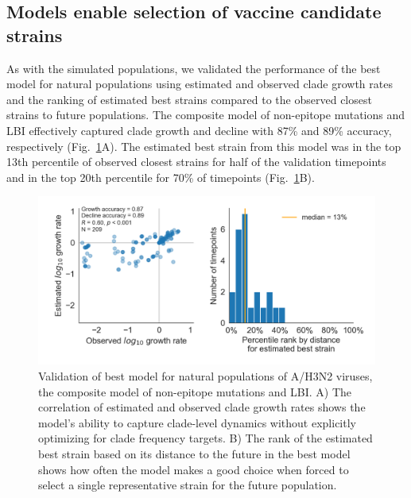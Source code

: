 \subsection*{Models enable selection of vaccine candidate strains}

As with the simulated populations, we validated the performance of the best model for natural populations using estimated and observed clade growth rates and the ranking of estimated best strains compared to the observed closest strains to future populations.
The composite model of non-epitope mutations and LBI effectively captured clade growth and decline with 87\% and 89\% accuracy, respectively (Fig.~\ref{fig:validation_of_best_model_for_natural_populations}A).
The estimated best strain from this model was in the top 13th percentile of observed closest strains for half of the validation timepoints and in the top 20th percentile for 70\% of timepoints (Fig.~\ref{fig:validation_of_best_model_for_natural_populations}B).

\begin{figure}[ht]
  \begin{center}
  \includegraphics[width=\textwidth]{figures/validation-of-best-model-for-natural-populations.png}
  \caption{
  Validation of best model for natural populations of A/H3N2 viruses, the composite model of non-epitope mutations and LBI.
  A) The correlation of estimated and observed clade growth rates shows the model's ability to capture clade-level dynamics without explicitly optimizing for clade frequency targets.
  B) The rank of the estimated best strain based on its distance to the future in the best model shows how often the model makes a good choice when forced to select a single representative strain for the future population.
  }
  \label{fig:validation_of_best_model_for_natural_populations}
  \end{center}
\end{figure}

